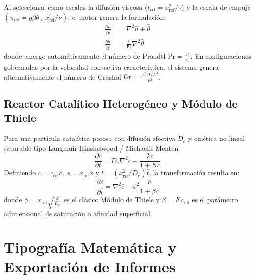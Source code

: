 \documentclass[11pt,a4paper]{article}
\theoremstyle{definition}
\theoremstyle{plain}
\theoremstyle{remark}
\newcommand{\refscale}[1]{#1_{\mathrm{ref}}}
\newcommand{\Pran}{\mathrm{Pr}}
\newcommand{\Gr}{\mathrm{Gr}}
\begin{document}
Al seleccionar como escalas la difusión viscosa ($\refscale{t} = \refscale{x}^2 / \nu$) y la escala de empuje $(\refscale{u} = g\beta \refscale{\theta} \refscale{x}^2 / \nu)$, el motor genera la formulación:
\begin{align}
    \frac{\partial \hat{u}}{\partial \hat{t}} &= \nabla^2 \hat{u} + \hat{\theta} \\
    \frac{\partial \hat{\theta}}{\partial \hat{t}} &= \frac{1}{\Pran} \nabla^2 \hat{\theta}
\end{align}
donde emerge automáticamente el número de Prandtl $\Pran = \frac{\nu}{\alpha_T}$. En configuraciones gobernadas por la velocidad convectiva característica, el sistema genera alternativamente el número de Grashof $\Gr = \frac{g\beta \Delta T L^3}{\nu^2}$.

\subsection{Reactor Catalítico Heterogéneo y Módulo de Thiele}

Para una partícula catalítica porosa con difusión efectiva $D_e$ y cinética no lineal saturable tipo Langmuir-Hinshelwood / Michaelis-Menten:
\begin{equation}
    \frac{\partial c}{\partial t} = D_e \nabla^2 c - \frac{k c}{1 + K c}
\end{equation}
Definiendo $c = \refscale{c} \hat{c}$, $x = \refscale{x} \hat{x}$ y $t = (\refscale{x}^2 / D_e) \hat{t}$, la transformación resulta en:
\begin{equation}
    \frac{\partial \hat{c}}{\partial \hat{t}} = \nabla^2 \hat{c} - \phi^2 \frac{\hat{c}}{1 + \beta \hat{c}}
\end{equation}
donde $\phi = \refscale{x} \sqrt{\frac{k}{D_e}}$ es el clásico Módulo de Thiele y $\beta = K \refscale{c}$ es el parámetro adimensional de saturación o afinidad superficial.

\section{Tipografía Matemática y Exportación de Informes}
\end{document}
